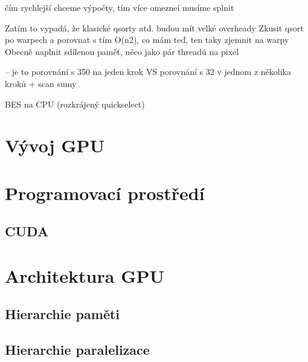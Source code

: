 


čím rychlejší chceme výpočty, tím více omezneí musíme splnit

Zatím to vypadá, že klasické qsorty atd. budou mít velké overheady
Zkusit qsort po warpech a porovnat s tím O(n2), co mám teď, ten taky zjemnit na warpy
Obecně naplnit sdílenou paměť, něco jako pár threadů na pixel

    -- je to porovnání s 350 na jeden krok VS porovnání s 32 v jednom z několika kroků + scan sumy

BES na CPU (rozkrájený quickselect)

\section{Vývoj GPU}
\section{Programovací prostředí}
    \subsection{CUDA}
\section{Architektura GPU}
    \subsection{Hierarchie paměti}
    \subsection{Hierarchie paralelizace}
